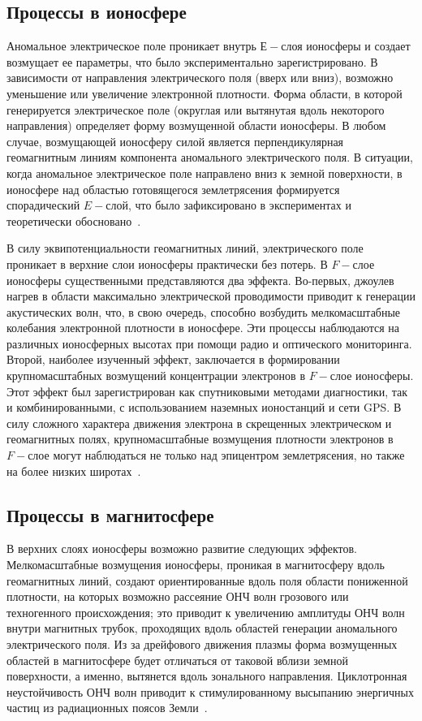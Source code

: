 \documentclass[12pt, oneside, a4paper]{article}
\begin{document}
\subsection{Процессы в ионосфере}
Аномальное электрическое поле проникает внутрь $Е-$слоя ионосферы и создает возмущает ее параметры, что было экспериментально зарегистрировано. В зависимости от направления электрического поля (вверх или вниз), возможно уменьшение или увеличение электронной плотности. Форма области, в которой генерируется электрическое поле (округлая или вытянутая вдоль некоторого направления) определяет форму возмущенной области ионосферы. В любом случае,  возмущающей ионосферу силой является перпендикулярная геомагнитным линиям компонента аномального электрического поля. В ситуации, когда аномальное электрическое поле направлено вниз к земной поверхности, в ионосфере над областью готовящегося землетрясения формируется спорадический $E-$слой, что было зафиксировано в экспериментах и теоретически обосновано~\cite{Kim:1994}.

В силу эквипотенциальности геомагнитных линий, электрического поле проникает в верхние слои ионосферы практически без потерь. В $F-$слое ионосферы существенными представляются два эффекта. Во-первых, джоулев нагрев в области максимально электрической проводимости  приводит к генерации акустических волн, что, в свою очередь, способно возбудить мелкомасштабные колебания электронной плотности в ионосфере. Эти процессы наблюдаются на различных ионосферных высотах при помощи радио и оптического мониторинга. Второй, наиболее изученный эффект, заключается в формировании крупномасштабных возмущений концентрации электронов в $F-$слое ионосферы. Этот эффект был зарегистрирован как спутниковыми методами диагностики, так и комбинированными, с использованием наземных ионостанций и сети GPS. В силу сложного характера движения электрона в скрещенных электрическом и геомагнитных полях, крупномасштабные возмущения плотности электронов в $F-$слое могут наблюдаться  не только над  эпицентром землетрясения, но также на более низких широтах~\cite{Lui:2004}. 
\subsection{Процессы в магнитосфере}
В верхних слоях ионосферы возможно развитие следующих эффектов. Мелкомасштабные возмущения ионосферы, проникая в магнитосферу вдоль геомагнитных линий, создают ориентированные вдоль поля области пониженной плотности, на которых возможно рассеяние ОНЧ волн грозового или техногенного происхождения; это приводит к увеличению амплитуды ОНЧ волн внутри магнитных трубок, проходящих вдоль областей генерации аномального электрического поля. Из за дрейфового движения плазмы форма возмущенных областей в магнитосфере будет отличаться от таковой вблизи земной поверхности, а именно, вытянется вдоль зонального направления. Циклотронная неустойчивость ОНЧ волн приводит к стимулированному высыпанию  энергичных частиц из радиационных поясов Земли~\cite{Galper:1995}.
\end{document}
